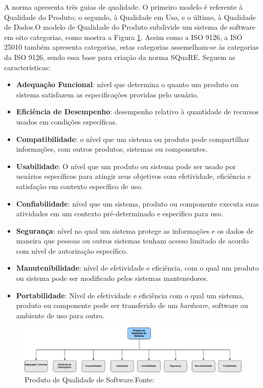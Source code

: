 A norma apresenta três guias de qualidade. O primeiro modelo é referente à Qualidade do Produto; o segundo, à Qualidade em Uso, e o último, à Qualidade de Dados.O modelo de Qualidade do Produto subdivide um sistema de software em oito categorias, como mostra a Figura \ref{img:modelo_square}.
Assim como a ISO 9126, a ISO 25010 também apresenta categorias, estas categorias assemelham-se às categorias da ISO 9126, sendo essa base para criação da norma SQuaRE. Seguem as características:

\begin{itemize}
\item \textbf{Adequação Funcional}: nível que determina o quanto um produto ou sistema satisfazem as especificações providas pelo usuário.
\item \textbf{Eficiência de Desempenho}: desempenho relativo à quantidade de recursos usados em condições específicas.
\item \textbf{Compatibilidade}: o nível que um sistema ou produto pode compartilhar informações, com outros produtos, sistemas ou componentes.
\item \textbf{Usabilidade}: O nível que um produto ou sistema pode ser usado por usuários específicos para atingir seus objetivos com efetividade, eficiência e satisfação em contexto específico de uso.
\item \textbf{Confiabilidade}: nível que um sistema, produto ou componente executa suas atividades em um contexto pré-determinado e específico para uso.
\item \textbf{Segurança}: nível no qual um sistema protege as informações e os dados de maneira que pessoas ou outros sistemas tenham acesso limitado de acordo com nível de autorização específico.
\item \textbf{Manutenibilidade}: nível de efetividade e eficiência, com o qual um produto ou sistema pode ser modificado pelos sistemas mantenedores.
\item \textbf{Portabilidade}: Nível de efetividade e eficiência com o qual um sistema, produto ou componente pode ser transferido de um \textit{hardware}, software ou ambiente de uso para outro.
\end{itemize}
\graphicspath{{figuras/}}
\begin{figure}[h!]
\centering
\includegraphics[scale=0.40]{SQuaRE}
\caption{Produto de Qualidade de Software.Fonte:\cite{Square}}
\label{img:modelo_square}
\end{figure}


